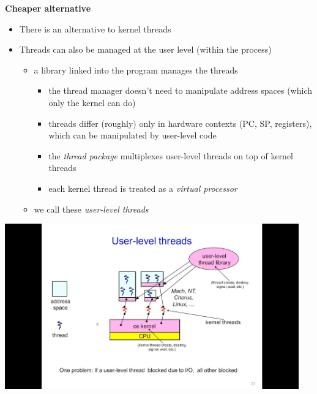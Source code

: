 \documentclass[11pt,a4paper]{article}
\begin{document}
\textbf{Cheaper alternative}
\begin{itemize}
    \item There is an alternative to kernel threads
    \item Threads can also be managed at the user level (within the process)
        \begin{itemize}
            \item a library linked into the program manages the threads
                \begin{itemize}
                    \item the thread manager doesn't need to manipulate address spaces
                        (which only the kernel can do)
                    \item threads differ (roughly) only in hardware contexts
                        (PC, SP, registers), which can be manipulated by user-level code
                    \item the \emph{thread package} multiplexes user-level threads on top
                        of kernel threads
                    \item each kernel thread is treated as a \emph{virtual processor}
                \end{itemize}
            \item we call these \emph{user-level threads}
        \end{itemize}
\end{itemize}

\includegraphics[height=270]{user-level-threads.jpg}
\end{document}
